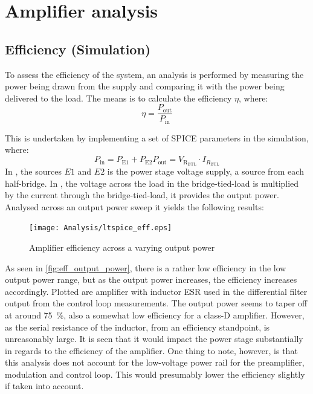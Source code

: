 \chapter{Amplifier analysis}

\section{Efficiency (Simulation)}
To assess the efficiency of the system, an analysis is performed by measuring the power being drawn from the supply and comparing it with the power being delivered to the load. The means is to calculate the efficiency $\eta$, where:
\begin{equation} \label{eq:eff_formula}
	\eta = \frac{P_{\mathrm{out}}}{P_{\mathrm{in}}}
\end{equation}

This is undertaken by implementing a set of SPICE parameters in the simulation, where:
\begin{subequations}
	\begin{equation} \label{eq:eff_power_in}
		P_{\mathrm{in}} = P_{\mathrm{E1}} + P_{\mathrm{E2}} 
	\end{equation}
	\begin{equation} \label{eq:eff_power_out}
		P_{\mathrm{out}} = V_{\mathrm{R_{\mathrm{BTL}}}} \cdot I_{R_{\mathrm{BTL}}}
	\end{equation}
\end{subequations}
In , the sources $E1$ and $E2$ is the power stage voltage supply, a source from each half-bridge. In , the voltage across the load in the bridge-tied-load is multiplied by the current through the bridge-tied-load, it provides the output power. Analysed across an output power sweep it yields the following results:

\begin{figure}[htbp]
	\centering
	\texttt{[image: Analysis/ltspice\_eff.eps]}
	\caption{Amplifier efficiency across a varying output power}
	\label{fig:eff_output_power}
\end{figure}

As seen in \autoref{fig:eff_output_power}, there is a rather low efficiency in the low output power range, but as the output power increases, the efficiency increases accordingly. Plotted are amplifier with inductor ESR used in the differential filter output from the control loop measurements. The output power seems to taper off at around \SI{75}{\percent}, also a somewhat low efficiency for a class-D amplifier. However, as the serial resistance of the inductor, from an efficiency standpoint, is unreasonably large. It is seen that it would impact the power stage substantially in regards to the efficiency of the amplifier. One thing to note, however, is that this analysis does not account for the low-voltage power rail for the preamplifier, modulation and control loop. This would presumably lower the efficiency slightly if taken into account.


